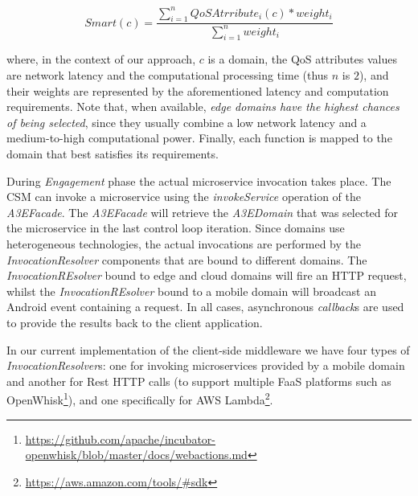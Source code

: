 \begin{equation}
Smart(c) = \frac{\sum_{i=1}^{n} QoSAtrribute_i(c)*weight_i}{\sum_{i=1}^{n}weight_i} \label{eq:smart}
\end{equation}

\noindent
where, in the context of our approach, $c$ is a domain, the QoS attributes values are network latency and the computational processing time (thus $n$ is $2$), and their weights are represented by the aforementioned latency and computation requirements. Note that, when available, \textit{edge domains have the highest chances of being selected}, since they usually combine a low network latency and a medium-to-high computational power. Finally, each function is mapped to the domain that best satisfies its requirements. 


During \textit{Engagement} phase the actual microservice invocation takes place. The CSM can invoke a microservice using the \textit{invokeService} operation of the  \textit{A3EFacade}. %
The \textit{A3EFacade} will retrieve the \textit{A3EDomain} that was selected for the microservice in the last control loop iteration. Since domains use heterogeneous technologies, the actual invocations are performed by the \textit{InvocationResolver} components that are bound to different domains. 
The \textit{InvocationREsolver} bound to edge and cloud domains will fire an HTTP request, whilst the \textit{InvocationREsolver} bound to a mobile domain will broadcast an Android event containing a request. In all cases, asynchronous \textit{callback}s are used to provide the results back to the client application. %


In our current implementation of the client-side middleware we have four types of \textit{InvocationResolver}s: one for invoking microservices provided by a mobile domain and another for Rest HTTP calls (to support multiple FaaS platforms such as OpenWhisk\footnote{\url{https://github.com/apache/incubator-openwhisk/blob/master/docs/webactions.md}}), and one specifically for AWS Lambda\footnote{\url{https://aws.amazon.com/tools/\#sdk}}. %


